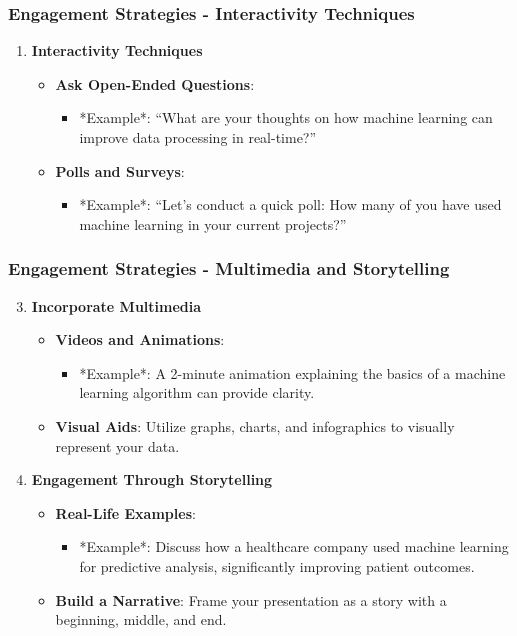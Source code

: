\documentclass[aspectratio=169]{beamer}
\begin{document}
\begin{frame}[fragile]
    \frametitle{Engagement Strategies - Interactivity Techniques}
    \begin{enumerate}
        \item \textbf{Interactivity Techniques}
        \begin{itemize}
            \item \textbf{Ask Open-Ended Questions}: 
            \begin{itemize}
                \item *Example*: ``What are your thoughts on how machine learning can improve data processing in real-time?''
            \end{itemize}
            \item \textbf{Polls and Surveys}: 
            \begin{itemize}
                \item *Example*: ``Let’s conduct a quick poll: How many of you have used machine learning in your current projects?''
            \end{itemize}
        \end{itemize}
    \end{enumerate}
\end{frame}

\begin{frame}[fragile]
    \frametitle{Engagement Strategies - Multimedia and Storytelling}
    \begin{enumerate}
        \setcounter{enumi}{2} %
        \item \textbf{Incorporate Multimedia}
        \begin{itemize}
            \item \textbf{Videos and Animations}: 
            \begin{itemize}
                \item *Example*: A 2-minute animation explaining the basics of a machine learning algorithm can provide clarity.
            \end{itemize}
            \item \textbf{Visual Aids}: Utilize graphs, charts, and infographics to visually represent your data.
        \end{itemize}
        
        \item \textbf{Engagement Through Storytelling}
        \begin{itemize}
            \item \textbf{Real-Life Examples}: 
            \begin{itemize}
                \item *Example*: Discuss how a healthcare company used machine learning for predictive analysis, significantly improving patient outcomes.
            \end{itemize}
            \item \textbf{Build a Narrative}: Frame your presentation as a story with a beginning, middle, and end.
        \end{itemize}
    \end{enumerate}
\end{frame}
\end{document}
